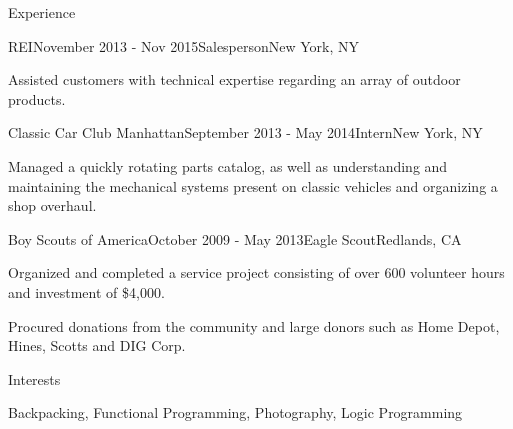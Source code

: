 \documentclass{resume} %
\begin{document}
\begin{rSection}{Experience}

\begin{rSubsection}{REI}{November 2013 - Nov 2015}{Salesperson}{New York, NY}
\item Assisted customers with technical expertise regarding an array of outdoor products.
\end{rSubsection}


\begin{rSubsection}{Classic Car Club Manhattan}{September 2013 - May 2014}{Intern}{New York, NY}
\item Managed a quickly rotating parts catalog, as well as understanding and maintaining the mechanical systems present on classic vehicles and organizing a shop overhaul.
\end{rSubsection}


\begin{rSubsection}{Boy Scouts of America}{October 2009 - May 2013}{Eagle Scout}{Redlands, CA}
\item Organized and completed a service project consisting of over 600 volunteer hours and investment of \$4,000.
\item Procured donations from the community and large donors such as Home Depot, Hines, Scotts and DIG Corp.
\end{rSubsection}

\end{rSection}


\begin{rSection}{Interests}

Backpacking, Functional Programming, Photography, Logic Programming

\end{rSection}





\end{document}
